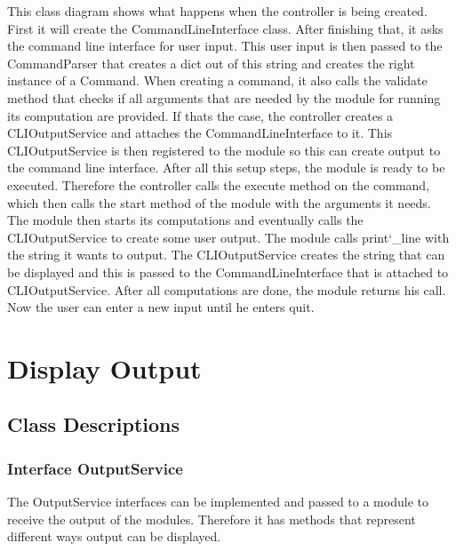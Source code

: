 \documentclass[parskip=full]{scrartcl}
\begin{document}
This class diagram shows what happens when the controller is being created.
First it will create the CommandLineInterface class.
After finishing that, it asks the command line interface for user input.
This user input is then passed to the CommandParser that creates a dict out of this string and creates the right instance of a Command.
When creating a command, it also calls the validate method that checks if all arguments that are needed by the module for running its computation are provided.
If thats the case, the controller creates a CLIOutputService and attaches the CommandLineInterface to it.
This CLIOutputService is then registered to the module so this can create output to the command line interface.
After all this setup steps, the module is ready to be executed.
Therefore the controller calls the execute method on the command, which then calls the start method of the module with the arguments it needs.
The module then starts its computations and eventually calls the CLIOutputService to create some user output.
The module calls print\char`_line with the string it wants to output.
The CLIOutputService creates the string that can be displayed and this is passed to the CommandLineInterface that is attached to CLIOutputService.
After all computations are done, the module returns his call.
Now the user can enter a new input until he enters quit.

\newpage
\begin{figure}[h]
\begin{center}

\label{Controller Sequence Diagram}
\end{center}
\end{figure}
\newpage

\section{Display Output}

\subsection{Class Descriptions}

\subsubsection{Interface OutputService}
The OutputService interfaces can be implemented and passed to a module to receive the output of the modules. 
Therefore it has methods that represent different ways output can be displayed. 
\end{document}
